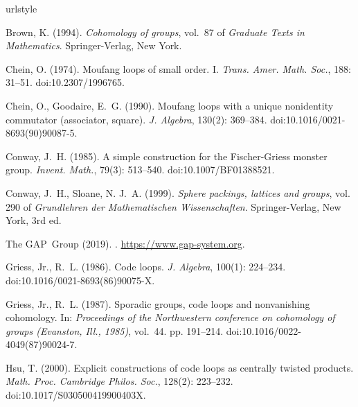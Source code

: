 \documentclass{article}
\theoremstyle{plain}
\theoremstyle{definition}
\begin{document}
% 
% 


\begin{thebibliography}{10}
\expandafter\ifx\csname urlstyle\endcsname\relax
 \providecommand{\doi}[1]{doi:\discretionary{}{}{}#1}\else
 \providecommand{\doi}{doi:\discretionary{}{}{}\begingroup
  \urlstyle{rm}\Url}\fi

Brown, K. (1994).
\newblock \emph{Cohomology of groups}, vol.~87 of \emph{Graduate Texts in
  Mathematics}.
\newblock Springer-Verlag, New York.

Chein, O. (1974).
\newblock Moufang loops of small order. {I}.
\newblock \emph{Trans. Amer. Math. Soc.}, 188: 31--51.
\newblock \doi{10.2307/1996765}.

Chein, O., Goodaire, E.~G. (1990).
\newblock Moufang loops with a unique nonidentity commutator (associator,
  square).
\newblock \emph{J. Algebra}, 130(2): 369--384.
\newblock \doi{10.1016/0021-8693(90)90087-5}.

Conway, J.~H. (1985).
\newblock A simple construction for the {F}ischer-{G}riess monster group.
\newblock \emph{Invent. Math.}, 79(3): 513--540.
\newblock \doi{10.1007/BF01388521}.

Conway, J.~H., Sloane, N. J.~A. (1999).
\newblock \emph{Sphere packings, lattices and groups}, vol. 290 of
  \emph{Grundlehren der Mathematischen Wissenschaften}.
\newblock Springer-Verlag, New York, 3rd ed.

The GAP~Group (2019).
. 
\newblock \url{https://www.gap-system.org}.

Griess, Jr., R.~L. (1986).
\newblock Code loops.
\newblock \emph{J. Algebra}, 100(1): 224--234.
\newblock \doi{10.1016/0021-8693(86)90075-X}.

Griess, Jr., R.~L. (1987).
\newblock Sporadic groups, code loops and nonvanishing cohomology.
\newblock In: \emph{Proceedings of the {N}orthwestern conference on cohomology
  of groups ({E}vanston, {I}ll., 1985)}, vol.~44. pp. 191--214.
\newblock \doi{10.1016/0022-4049(87)90024-7}.

Hsu, T. (2000).
\newblock Explicit constructions of code loops as centrally twisted products.
\newblock \emph{Math. Proc. Cambridge Philos. Soc.}, 128(2): 223--232.
\newblock \doi{10.1017/S030500419900403X}.


\end{thebibliography}
\end{document}
